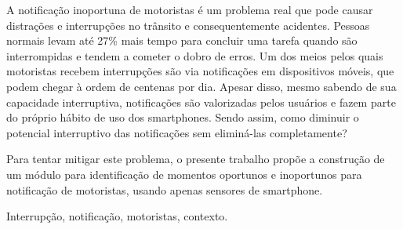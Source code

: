 A notificação inoportuna de motoristas é um problema real que pode causar distrações e interrupções no trânsito e
consequentemente acidentes. Pessoas normais levam até 27\% mais tempo para concluir uma tarefa quando são interrompidas
e tendem a cometer o dobro de erros. Um dos meios pelos quais motoristas recebem interrupções são via notificações
em dispositivos móveis, que podem chegar à ordem de centenas por dia. Apesar disso, mesmo sabendo de sua capacidade
interruptiva, notificações são valorizadas pelos usuários e fazem parte do próprio hábito de uso dos smartphones.
Sendo assim, como diminuir o potencial interruptivo das notificações sem eliminá-las completamente?

Para tentar mitigar este problema, o presente trabalho propõe a construção de um módulo para identificação de
momentos oportunos e inoportunos para notificação de motoristas, usando apenas sensores de smartphone.

\begin{keywords}
Interrupção, notificação, motoristas, contexto.
\end{keywords}
